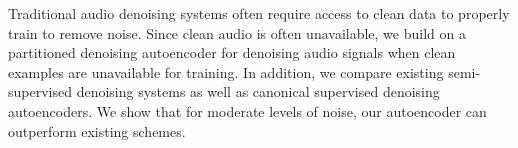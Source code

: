 Traditional audio denoising systems often require access to clean data to properly train to remove noise. Since clean audio is often unavailable, we build on a partitioned denoising autoencoder for denoising audio signals when clean examples are unavailable for training. In addition, we compare existing semi-supervised denoising systems as well as canonical supervised denoising autoencoders. We show that for moderate levels of noise, our autoencoder can outperform existing schemes.
